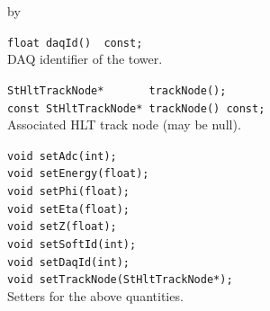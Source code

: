 \documentclass[twoside]{article}
\newcommand{\entrylabel}[1]{\mbox{\textbf{{#1}}}\hfil}%
\newenvironment{entry}
{\begin{list}{}%
    {\renewcommand{\makelabel}{\entrylabel}%
     \setlength{\labelwidth}{90pt}%
     \setlength{\leftmargin}{\labelwidth}
     \advance\leftmargin by \labelsep%
      }%
    }%
  {\end{list}}
\newcommand{\Entrylabel}[1]%
{\raisebox{0pt}[1ex][0pt]{\makebox[\labelwidth][l]%
    {\parbox[t]{\labelwidth}{\hspace{0pt}\textbf{{#1}}}}}}
\newenvironment{Entry}%
{\renewcommand{\entrylabel}{\Entrylabel}\begin{entry}}%
  {\end{entry}}
\begin{document}
\begin{Entry}
    \verb+float daqId()  const;+\\
    DAQ identifier of the tower.

    \verb+StHltTrackNode*       trackNode();+\\
    \verb+const StHltTrackNode* trackNode() const;+\\
    Associated HLT track node (may be null).

    \verb+void setAdc(int);+\\
    \verb+void setEnergy(float);+\\
    \verb+void setPhi(float);+\\
    \verb+void setEta(float);+\\
    \verb+void setZ(float);+\\
    \verb+void setSoftId(int);+\\
    \verb+void setDaqId(int);+\\
    \verb+void setTrackNode(StHltTrackNode*);+\\
    Setters for the above quantities.
\end{Entry}
\clearpage

\end{document}
